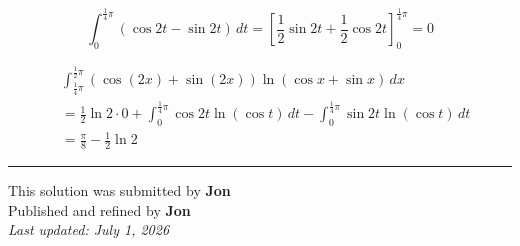 \documentclass[12pt]{article}
\begin{document}
$$\int_0^{\frac14\pi}(\cos2t-\sin2t)\,dt
=\left[\frac12\sin2t+\frac12\cos2t\right]_0^{\frac14\pi}=0$$


\begin{align*}
&\int_{\frac14\pi}^{\frac12\pi}(\cos(2x)+\sin(2x))\ln(\cos x+\sin x)\,dx\\
&=\frac12\ln2\cdot 0
+\int_0^{\frac14\pi}\cos2t\ln(\cos t)\,dt
-\int_0^{\frac14\pi}\sin2t\ln(\cos t)\,dt\\
&=\frac{\pi}{8}-\frac12\ln2
\end{align*}
\bigskip

\hrule
\begin{center}
    This solution was submitted by \textbf{Jon}\\[4pt]
    Published and refined by \textbf{Jon}\\[8pt]
    \textit{Last updated: July 1, 2026}
\end{center}
\end{document}
